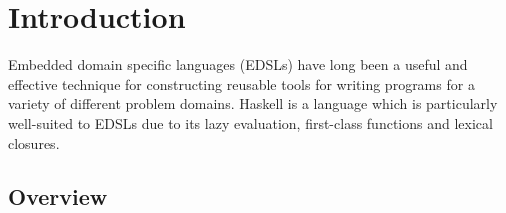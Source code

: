 \documentclass[sigplan,screen]{acmart}
\begin{document}




\maketitle

\section{Introduction}

Embedded domain specific languages (EDSLs) have long been a useful and effective
technique for constructing reusable tools for writing programs for a variety of
different problem domains. Haskell is a language which is particularly
well-suited to EDSLs due to its lazy evaluation, first-class functions and
lexical closures.

\subsection{Overview}
\end{document}
